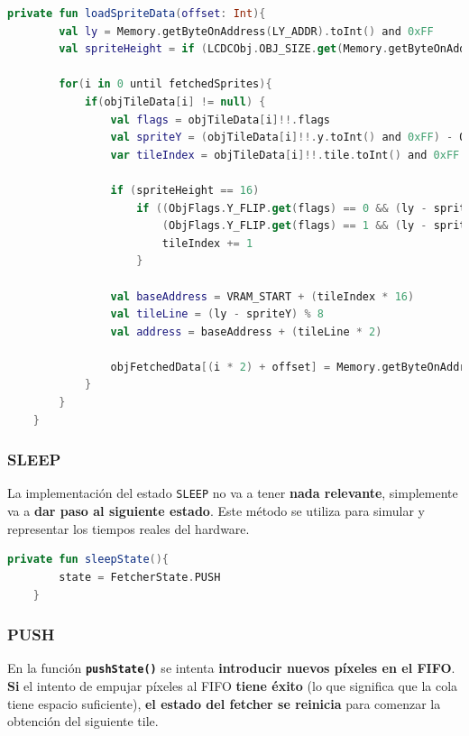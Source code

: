 \begin{lstlisting}[language=Kotlin, caption={FIFO Fetcher - Obtención de Información de un Sprite en la Línea Actual.}, label={code:ppufifogethighlowdatasprite}]
    private fun loadSpriteData(offset: Int){
        val ly = Memory.getByteOnAddress(LY_ADDR).toInt() and 0xFF
        val spriteHeight = if (LCDCObj.OBJ_SIZE.get(Memory.getByteOnAddress(LCDC_ADDR)) == 1) 16 else 8

        for(i in 0 until fetchedSprites){
            if(objTileData[i] != null) {
                val flags = objTileData[i]!!.flags
                val spriteY = (objTileData[i]!!.y.toInt() and 0xFF) - OAM_Y_OFFSET
                var tileIndex = objTileData[i]!!.tile.toInt() and 0xFF

                if (spriteHeight == 16)
                    if ((ObjFlags.Y_FLIP.get(flags) == 0 && (ly - spriteY) >= 8) ||
                        (ObjFlags.Y_FLIP.get(flags) == 1 && (ly - spriteY) < 8)) {
                        tileIndex += 1
                    }

                val baseAddress = VRAM_START + (tileIndex * 16)
                val tileLine = (ly - spriteY) % 8
                val address = baseAddress + (tileLine * 2)

                objFetchedData[(i * 2) + offset] = Memory.getByteOnAddress(address + offset)
            }
        }
    }
\end{lstlisting}
\clearpage
\subsubsection{SLEEP}
La implementación del estado \texttt{SLEEP} no va a tener \textbf{nada relevante}, simplemente va a \textbf{dar paso al siguiente estado}. Este método se utiliza para simular y representar los tiempos reales del hardware.

\begin{lstlisting}[language=Kotlin, caption={FIFO Fetcher - Sleep.}, label={code:ppufifosleep}]
    private fun sleepState(){
        state = FetcherState.PUSH
    }
\end{lstlisting}

\subsubsection{PUSH}

En la función \textbf{\texttt{pushState()}} se intenta \textbf{introducir nuevos píxeles en el FIFO}. \textbf{Si} el intento de empujar píxeles al FIFO \textbf{tiene éxito} (lo que significa que la cola tiene espacio suficiente), \textbf{el estado del fetcher se reinicia} para comenzar la obtención del siguiente tile.

